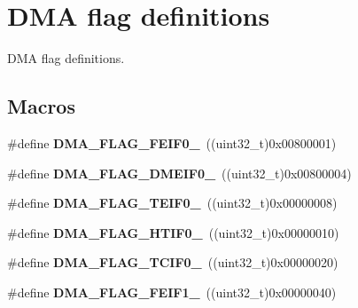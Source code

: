 \hypertarget{group___d_m_a__flag__definitions}{}\section{D\+MA flag definitions}
\label{group___d_m_a__flag__definitions}


D\+MA flag definitions.  


\subsection*{Macros}
\begin{DoxyCompactItemize}
\item 
\#define {\bfseries D\+M\+A\+\_\+\+F\+L\+A\+G\+\_\+\+F\+E\+I\+F0\+\_}~((uint32\+\_\+t)0x00800001)\hypertarget{group___d_m_a__flag__definitions_ga6f44b274316a463c9302d770b8205640}{}\label{group___d_m_a__flag__definitions_ga6f44b274316a463c9302d770b8205640}

\item 
\#define {\bfseries D\+M\+A\+\_\+\+F\+L\+A\+G\+\_\+\+D\+M\+E\+I\+F0\+\_}~((uint32\+\_\+t)0x00800004)\hypertarget{group___d_m_a__flag__definitions_gaee0e6da831d62bc84e9e28e59b8e9ede}{}\label{group___d_m_a__flag__definitions_gaee0e6da831d62bc84e9e28e59b8e9ede}

\item 
\#define {\bfseries D\+M\+A\+\_\+\+F\+L\+A\+G\+\_\+\+T\+E\+I\+F0\+\_}~((uint32\+\_\+t)0x00000008)\hypertarget{group___d_m_a__flag__definitions_gab98ef70ba0c1498d4c967a10b3f6e67f}{}\label{group___d_m_a__flag__definitions_gab98ef70ba0c1498d4c967a10b3f6e67f}

\item 
\#define {\bfseries D\+M\+A\+\_\+\+F\+L\+A\+G\+\_\+\+H\+T\+I\+F0\+\_}~((uint32\+\_\+t)0x00000010)\hypertarget{group___d_m_a__flag__definitions_ga976fee242270824013f1fc0b6bd4c446}{}\label{group___d_m_a__flag__definitions_ga976fee242270824013f1fc0b6bd4c446}

\item 
\#define {\bfseries D\+M\+A\+\_\+\+F\+L\+A\+G\+\_\+\+T\+C\+I\+F0\+\_}~((uint32\+\_\+t)0x00000020)\hypertarget{group___d_m_a__flag__definitions_ga19dfe70176841c6972818e279ba02436}{}\label{group___d_m_a__flag__definitions_ga19dfe70176841c6972818e279ba02436}

\item 
\#define {\bfseries D\+M\+A\+\_\+\+F\+L\+A\+G\+\_\+\+F\+E\+I\+F1\+\_}~((uint32\+\_\+t)0x00000040)\hypertarget{group___d_m_a__flag__definitions_ga16a04159a9a7c434ac02e5c6ff630b2e}{}\label{group___d_m_a__flag__definitions_ga16a04159a9a7c434ac02e5c6ff630b2e}


\end{DoxyCompactItemize}
